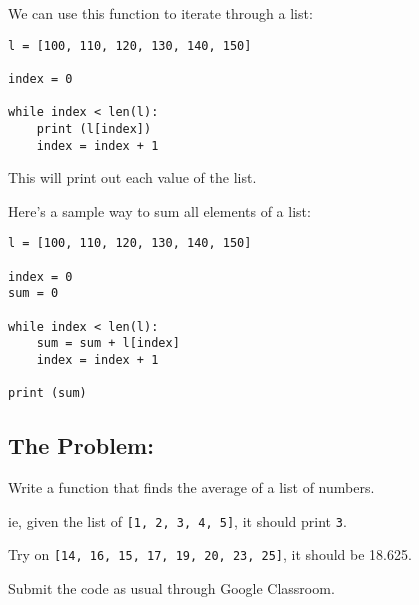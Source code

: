 \documentclass[11pt]{article}
\begin{document}
We can use this function to iterate through a list:

\begin{verbatim}
l = [100, 110, 120, 130, 140, 150]

index = 0

while index < len(l):
    print (l[index])
    index = index + 1
\end{verbatim}

This will print out each value of the list.

Here's a sample way to sum all elements of a list:

\begin{verbatim}
l = [100, 110, 120, 130, 140, 150]

index = 0
sum = 0

while index < len(l):
    sum = sum + l[index]
    index = index + 1

print (sum)
\end{verbatim}

\subsection{The Problem:}
\label{sec:orgfa767b0}
Write a function that finds the average of a list of numbers.

ie, given the list of \texttt{[1, 2, 3, 4, 5]}, it should print \texttt{3}.

Try on \texttt{[14, 16, 15, 17, 19, 20, 23, 25]}, it should be 18.625.

Submit the code as usual through Google Classroom.
\end{document}

